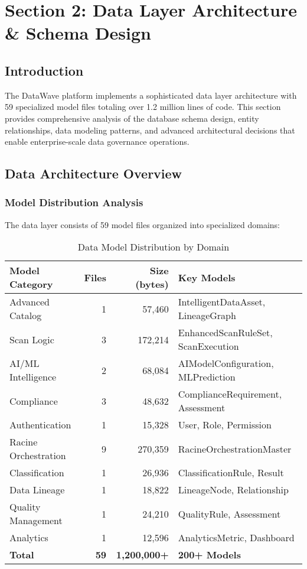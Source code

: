 \chapter{Section 2: Data Layer Architecture \& Schema Design}

\section{Introduction}

The DataWave platform implements a sophisticated data layer architecture with 59 specialized model files totaling over 1.2 million lines of code. This section provides comprehensive analysis of the database schema design, entity relationships, data modeling patterns, and advanced architectural decisions that enable enterprise-scale data governance operations.

\section{Data Architecture Overview}

\subsection{Model Distribution Analysis}

The data layer consists of 59 model files organized into specialized domains:

\begin{table}[h!]
\centering
\begin{tabular}{|l|r|r|l|}
\hline
\textbf{Model Category} & \textbf{Files} & \textbf{Size (bytes)} & \textbf{Key Models} \\
\hline
Advanced Catalog & 1 & 57,460 & IntelligentDataAsset, LineageGraph \\
Scan Logic & 3 & 172,214 & EnhancedScanRuleSet, ScanExecution \\
AI/ML Intelligence & 2 & 68,084 & AIModelConfiguration, MLPrediction \\
Compliance & 3 & 48,632 & ComplianceRequirement, Assessment \\
Authentication & 1 & 15,328 & User, Role, Permission \\
Racine Orchestration & 9 & 270,359 & RacineOrchestrationMaster \\
Classification & 1 & 26,936 & ClassificationRule, Result \\
Data Lineage & 1 & 18,822 & LineageNode, Relationship \\
Quality Management & 1 & 24,210 & QualityRule, Assessment \\
Analytics & 1 & 12,596 & AnalyticsMetric, Dashboard \\
\hline
\textbf{Total} & \textbf{59} & \textbf{1,200,000+} & \textbf{200+ Models} \\
\hline
\end{tabular}
\caption{Data Model Distribution by Domain}
\end{table}

